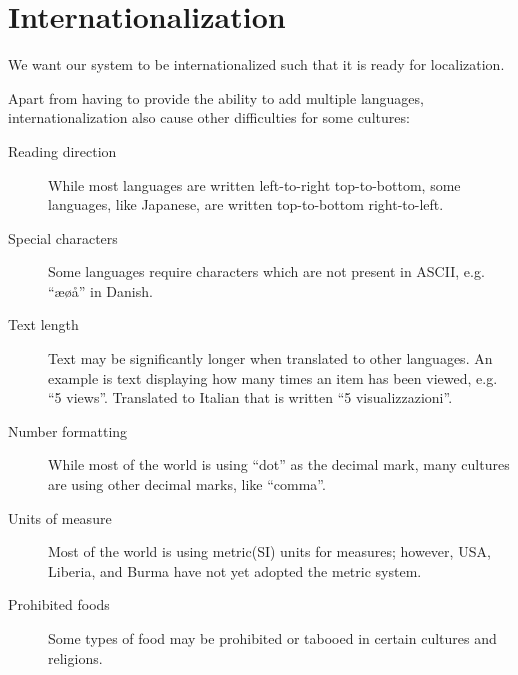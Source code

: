 \section{Internationalization}
We want our system to be internationalized such that it is ready for localization.

Apart from having to provide the ability to add multiple languages, internationalization also cause other difficulties for some cultures:

\begin{description}
  \item[Reading direction] While most languages are written left-to-right top-to-bottom, some languages, like Japanese, are written top-to-bottom right-to-left.
  \item[Special characters] Some languages require characters which are not present in ASCII, e.g. ``æøå'' in Danish.
  \item[Text length] Text may be significantly longer when translated to other languages. An example is text displaying how many times an item has been viewed, e.g. ``5 views''. Translated to Italian that is written ``5 visualizzazioni''\cite{wordlength}.
  \item[Number formatting] While most of the world is using ``dot'' as the decimal mark, many cultures are using other decimal marks, like ``comma''.
  \item[Units of measure] Most of the world is using metric(SI) units for measures; however, USA, Liberia, and Burma have not yet adopted the metric system\cite{unitsfactbook}.
  \item[Prohibited foods] Some types of food may be prohibited or tabooed in certain cultures and religions.
\end{description}